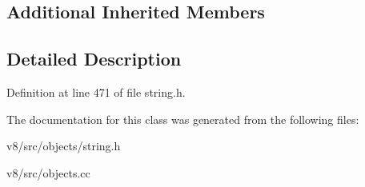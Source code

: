 \subsection*{Additional Inherited Members}


\subsection{Detailed Description}


Definition at line 471 of file string.\+h.



The documentation for this class was generated from the following files\+:\begin{DoxyCompactItemize}
\item 
v8/src/objects/string.\+h\item 
v8/src/objects.\+cc\end{DoxyCompactItemize}
